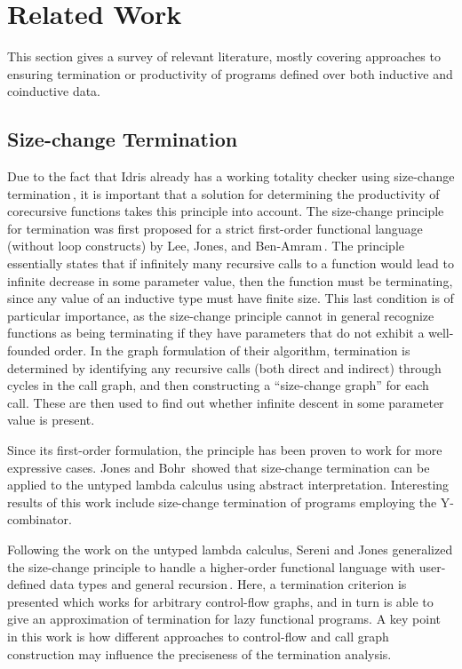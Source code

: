 \section{Related Work}
\label{sec:related_work}
This section gives a survey of relevant literature, mostly covering approaches to ensuring termination or productivity of programs defined over both inductive and coinductive data.

\subsection{Size-change Termination}
Due to the fact that Idris already has a working totality checker using size-change termination\,\citep{BradyIdrisImpl13}, it is important that a solution for determining the productivity of corecursive functions takes this principle into account. The size-change principle for termination was first proposed for a strict first-order functional language (without loop constructs) by Lee, Jones, and Ben-Amram\,\citep{LeeJones01SizeChange}. The principle essentially states that if infinitely many recursive calls to a function would lead to infinite decrease in some parameter value, then the function must be terminating, since any value of an inductive type must have finite size. This last condition is of particular importance, as the size-change principle cannot in general recognize functions as being terminating if they have parameters that do not exhibit a well-founded order. In the graph formulation of their algorithm, termination is determined by identifying any recursive calls (both direct and indirect) through cycles in the call graph, and then constructing a ``size-change graph'' for each call. These are then used to find out whether infinite descent in some parameter value is present.

Since its first-order formulation, the principle has been proven to work for more expressive cases. Jones and Bohr\,\citep{Jones04Untyped} showed that size-change termination can be applied to the untyped lambda calculus using abstract interpretation. Interesting results of this work include size-change termination of programs employing the Y-combinator.

Following the work on the untyped lambda calculus, Sereni and Jones generalized the size-change principle to handle a higher-order functional language with user-defined data types and general recursion\,\citep{Sereni05terminationanalysis,Sereni06Phd}. Here, a termination criterion is presented which works for arbitrary control-flow graphs, and in turn is able to give an approximation of termination for lazy functional programs. A key point in this work is how different approaches to control-flow and call graph construction may influence the preciseness of the termination analysis.

